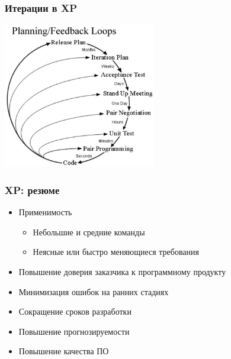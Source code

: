 \documentclass{../../slides-style}
\begin{document}
    \begin{frame}
        \frametitle{Итерации в XP}
        \begin{center}
            \includegraphics[width=0.5\textwidth]{xpIterations.png}
        \end{center}
    \end{frame}

    \begin{frame}
        \frametitle{XP: резюме}
        \begin{itemize}
            \item Применимость
            \begin{itemize}
                \item Небольшие и средние команды
                \item Неясные или быстро меняющиеся требования
            \end{itemize}
            \item Повышение доверия заказчика к программному продукту
            \item Минимизация ошибок на ранних стадиях
            \item Сокращение сроков разработки
            \item Повышение прогнозируемости
            \item Повышение качества ПО
        \end{itemize}
    \end{frame}
\end{document}
